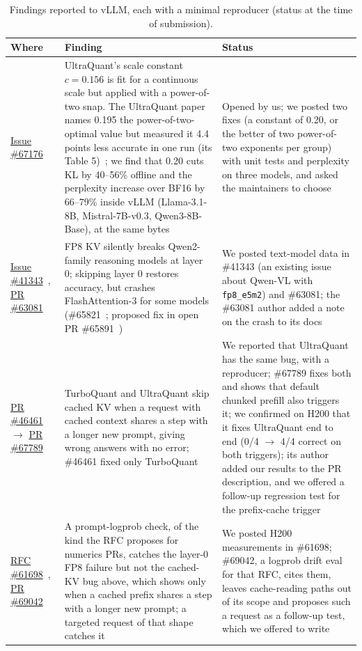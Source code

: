 \documentclass[11pt]{article}
\begin{document}
\begin{table}[!htb]
\centering
\caption{Findings reported to vLLM, each with a minimal reproducer (status at the time of submission).}
\label{tab:vllm}
\small
\begin{tabularx}{\linewidth}{@{}P{3.0cm}LP{4.4cm}@{}}
\toprule
Where & Finding & Status \\
\midrule
\href{https://github.com/vllm-project/vllm/issues/67176}{Issue \#67176}~\cite{vllm67176} & UltraQuant's scale constant $c = 0.156$ is fit for a continuous scale but applied with a power-of-two snap. The UltraQuant paper names 0.195 the power-of-two-optimal value but measured it 4.4 points less accurate in one run (its Table 5)~\cite{chakrabarti2026ultraquant}; we find that 0.20 cuts KL by 40--56\% offline and the perplexity increase over BF16 by 66--79\% inside vLLM (Llama-3.1-8B, Mistral-7B-v0.3, Qwen3-8B-Base), at the same bytes & Opened by us; we posted two fixes (a constant of 0.20, or the better of two power-of-two exponents per group) with unit tests and perplexity on three models, and asked the maintainers to choose \\
\addlinespace
\href{https://github.com/vllm-project/vllm/issues/41343}{Issue \#41343}~\cite{vllm41343}, \href{https://github.com/vllm-project/vllm/pull/63081}{PR \#63081}~\cite{vllm63081} & FP8 KV silently breaks Qwen2-family reasoning models at layer 0; skipping layer 0 restores accuracy, but crashes FlashAttention-3 for some models (\#65821~\cite{vllm65821}; proposed fix in open PR \#65891~\cite{vllm65891}) & We posted text-model data in \#41343 (an existing issue about Qwen-VL with \texttt{fp8\_e5m2}) and \#63081; the \#63081 author added a note on the crash to its docs \\
\addlinespace
\href{https://github.com/vllm-project/vllm/pull/46461}{PR \#46461}~\cite{vllm46461} $\rightarrow$ \href{https://github.com/vllm-project/vllm/pull/67789}{PR \#67789}~\cite{vllm67789} & TurboQuant and UltraQuant skip cached KV when a request with cached context shares a step with a longer new prompt, giving wrong answers with no error; \#46461 fixed only TurboQuant & We reported that UltraQuant has the same bug, with a reproducer; \#67789 fixes both and shows that default chunked prefill also triggers it; we confirmed on H200 that it fixes UltraQuant end to end (0/4 $\rightarrow$ 4/4 correct on both triggers); its author added our results to the PR description, and we offered a follow-up regression test for the prefix-cache trigger \\
\addlinespace
\href{https://github.com/vllm-project/vllm/issues/61698}{RFC \#61698}~\cite{vllm61698}, \href{https://github.com/vllm-project/vllm/pull/69042}{PR \#69042}~\cite{vllm69042} & A prompt-logprob check, of the kind the RFC proposes for numerics PRs, catches the layer-0 FP8 failure but not the cached-KV bug above, which shows only when a cached prefix shares a step with a longer new prompt; a targeted request of that shape catches it & We posted H200 measurements in \#61698; \#69042, a logprob drift eval for that RFC, cites them, leaves cache-reading paths out of its scope and proposes such a request as a follow-up test, which we offered to write \\

\end{tabularx}
\end{table}
\end{document}
